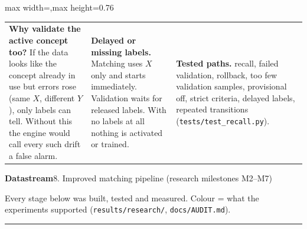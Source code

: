 \documentclass[10pt]{article}
\newcommand{\pagetitle}[2]{%
  {\Huge\bfseries Datastream}\hfill{\large #1}\par\vspace{2pt}
  {\large\color{ink!70} #2}\par\vspace{8pt}\hrule\vspace{14pt}}
\begin{document}
\begin{center}
\begin{adjustbox}{max width=\textwidth,max height=0.76\textheight}
\end{adjustbox}
\end{center}
\vfill
\begin{tabular}{@{}p{12cm}p{12cm}p{12cm}@{}}
\textbf{Why validate the active concept too?} If the data looks like the concept already in use but errors rose (same $X$, different $Y$), only labels can tell. Without this the engine would call every such drift a false alarm. &
\textbf{Delayed or missing labels.} Matching uses $X$ only and starts immediately. Validation waits for released labels. With no labels at all nothing is activated or trained. &
\textbf{Tested paths.} recall, failed validation, rollback, too few validation samples, provisional off, strict criteria, delayed labels, repeated transitions (\texttt{tests/test\_recall.py}).
\end{tabular}
\clearpage

\pagetitle{8. Improved matching pipeline (research milestones M2--M7)}{Every stage below was built, tested and measured. Colour = what the experiments supported (\texttt{results/research/}, \texttt{docs/AUDIT.md}).}
\end{document}
